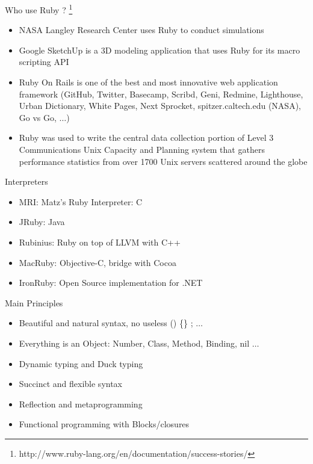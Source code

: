 \documentclass[10pt]{beamer}
\begin{document}
\begin{frame}{Who use Ruby ? \footnote{http://www.ruby-lang.org/en/documentation/success-stories/} }
\begin{itemize}
	\item NASA Langley Research Center uses Ruby to conduct simulations
	\item Google SketchUp is a 3D modeling application that uses Ruby for its macro scripting API
	\item Ruby On Rails is one of the best and most innovative web application framework (GitHub, Twitter, Basecamp, Scribd, Geni, Redmine, Lighthouse, Urban Dictionary, White Pages, Next Sprocket, spitzer.caltech.edu (NASA), Go vs Go, $\ldots$)
	\item Ruby was used to write the central data collection portion of Level 3 Communications Unix Capacity and Planning system that gathers performance statistics from over 1700 Unix servers scattered around the globe
\end{itemize}
\end{frame}

\begin{frame}{Interpreters}
\begin{itemize}
	\item MRI: Matz's Ruby Interpreter: C
	\item JRuby: Java
	\item Rubinius: Ruby on top of LLVM with C++
	\item MacRuby: Objective-C, bridge with Cocoa
	\item IronRuby: Open Source implementation for .NET
\end{itemize}
\end{frame}

\begin{frame}{Main Principles}
\begin{itemize}
	\item Beautiful and natural syntax, no useless () \{\} ; $\ldots$
	\item Everything is an Object: Number, Class, Method, Binding, nil $\ldots$
	\item Dynamic typing and Duck typing
	\item Succinct and flexible syntax
	\item Reflection and metaprogramming
	\item Functional programming with Blocks/closures
\end{itemize}
\end{frame}
\end{document}
